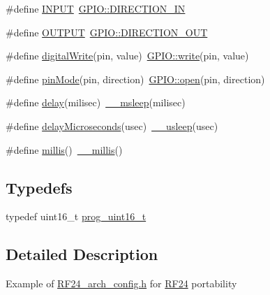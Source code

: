 \begin{DoxyCompactItemize}
$$\item 
\#define \hyperlink{group__Porting__General_ga1bb283bd7893b9855e2f23013891fc82}{I\+N\+P\+UT}~\hyperlink{group__Porting__GPIO_gafbf58b193d0f84db90a843e00f27367c}{G\+P\+I\+O\+::\+D\+I\+R\+E\+C\+T\+I\+O\+N\+\_\+\+IN}
\item 
\#define \hyperlink{group__Porting__General_ga61a3c9a18380aafb6e430e79bf596557}{O\+U\+T\+P\+UT}~\hyperlink{group__Porting__GPIO_gac39c2a3ce71b0df667c227292d4ab30c}{G\+P\+I\+O\+::\+D\+I\+R\+E\+C\+T\+I\+O\+N\+\_\+\+O\+UT}
\item 
\#define \hyperlink{group__Porting__General_gabda89b115581947337690b2f85bfab6e}{digital\+Write}(pin,  value)~\hyperlink{group__Porting__GPIO_ga957694ca061e30268dd8a4b28a08e59b}{G\+P\+I\+O\+::write}(pin, value)
\item 
\#define \hyperlink{group__Porting__General_ga361649efb4f1e2fa3c870ca203497d5e}{pin\+Mode}(pin,  direction)~\hyperlink{group__Porting__GPIO_gad3451cca241dbbf42bf381129385a35c}{G\+P\+I\+O\+::open}(pin, direction)
\item 
\#define \hyperlink{group__Porting__General_ga70a331e8ddf9acf9d33c47b71cda4c5f}{delay}(milisec)~\hyperlink{group__Porting__Timing_ga4c2e4dffa20576f5b3d9c2f9bb052106}{\+\_\+\+\_\+msleep}(milisec)
\item 
\#define \hyperlink{group__Porting__General_ga9384257bf5d5c1aae675b22cc3ecb91a}{delay\+Microseconds}(usec)~\hyperlink{group__Porting__Timing_gaec87320f2886551c012814de85713681}{\+\_\+\+\_\+usleep}(usec)
\item 
\#define \hyperlink{group__Porting__General_gad5b3ec1ce839fa1c4337a7d0312e9749}{millis}()~\hyperlink{group__Porting__Timing_gad13c7acd564917af4f86b655035a6424}{\+\_\+\+\_\+millis}()
\end{DoxyCompactItemize}
\subsection*{Typedefs}
\begin{DoxyCompactItemize}
\item 
typedef uint16\+\_\+t \hyperlink{group__Porting__General_ga05ca2f20b55933ad782917161d54287d}{prog\+\_\+uint16\+\_\+t}
\end{DoxyCompactItemize}


\subsection{Detailed Description}
Example of \hyperlink{RF24__arch__config_8h}{R\+F24\+\_\+arch\+\_\+config.\+h} for \hyperlink{classRF24}{R\+F24} portability 

